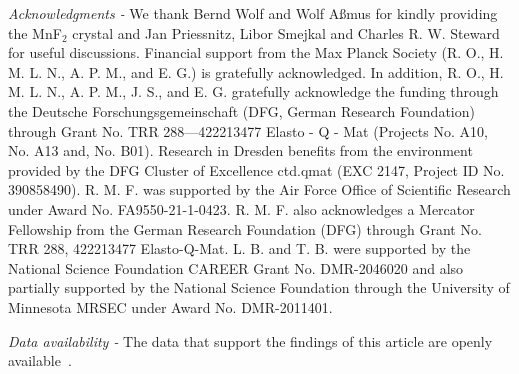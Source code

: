 \documentclass[
 reprint,










 amsmath,amssymb,
 aps,






]{revtex4-2}
\begin{document}
\textit{Acknowledgments - }We thank Bernd Wolf and Wolf Aßmus for kindly providing the MnF$_2$ crystal and Jan Priessnitz, Libor Smejkal and Charles R. W. Steward for useful discussions. Financial support from the Max Planck Society (R. O., H. M. L. N., A. P. M., and E. G.)  is gratefully acknowledged. In addition, R. O., H. M. L. N., A. P. M., J. S., and E. G. gratefully acknowledge the funding through the Deutsche Forschungsgemeinschaft (DFG, German Research Foundation) through Grant No. TRR 288—422213477 Elasto - Q - Mat (Projects No. A10, No. A13 and, No. B01). Research in Dresden benefits from the environment provided by the DFG Cluster of Excellence ctd.qmat (EXC 2147, Project ID No. 390858490). R. M. F. was supported by the Air Force Office of Scientific Research under Award No. FA9550-21-1-0423. R. M. F.
also acknowledges a Mercator Fellowship from the German Research Foundation (DFG) through Grant No. TRR 288,
422213477 Elasto-Q-Mat.
L. B. and T. B. were supported by the National Science Foundation CAREER Grant No. DMR-2046020 and also partially supported by the National Science Foundation through the University of Minnesota MRSEC under Award No. DMR-2011401.

\textit{Data availability - }
The data that support the findings of this article are openly available~\cite{Data26}.
\end{document}
